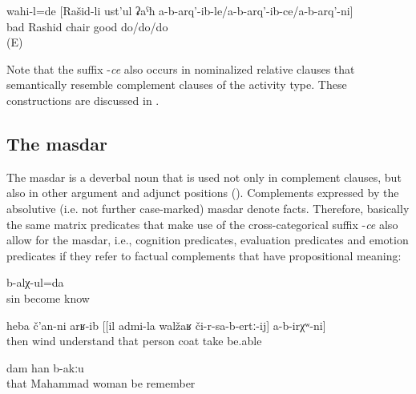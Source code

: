 \begin{exe}
	\ex	\label{ex:It was bad that Rashid did not repair the chair}
	\gll	wahi-l=de [Rašid-li ust'ul ʡaˁħ a-b-arq'-ib-le\slash a-b-arq'-ib-ce\slash a-b-arq'-ni]\\
		bad Rashid chair good do\slash{}do\slash{}do\\
	\glt	{} (E)
\end{exe}

Note that the suffix -\textit{ce} also occurs in nominalized relative clauses that semantically resemble complement clauses of the activity type. These constructions are discussed in .


\subsection{The masdar}
\label{ssec:The masdarComplementation}

The masdar is a deverbal noun that is used not only in complement clauses, but also in other argument and adjunct positions (). Complements expressed by the absolutive (i.e. not further case-marked) masdar denote facts. Therefore, basically the same matrix predicates that make use of the cross-categorical suffix -\textit{ce} also allow for the masdar, i.e., cognition predicates, evaluation predicates and emotion predicates if they refer to factual complements that have propositional meaning:
%
\begin{exe}
	\ex	\label{ex:‎‎I know that this will be a sin}
		b-alχ-ul=da\\
		sin	become	know\\
	\glt	{}

	\ex	\label{ex:‎‎‎Then the wind understood that he would not be able to take off the coat of this person}
	\gll	heba	č'an-ni	arʁ-ib	[[il	admi-la	walžaʁ	či-r-sa-b-ertː-ij]	a-b-irχʷ-ni]\\
		then	wind	understand	that	person	coat	take	be.able\\
	\glt	{}

	\ex	\label{ex:‎‎‎I don't remember that she was Mahammad's wife}
		dam	han	b-akːu\\
		that	Mahammad	woman	be		remember	\\
	\glt	{}
\end{exe}

